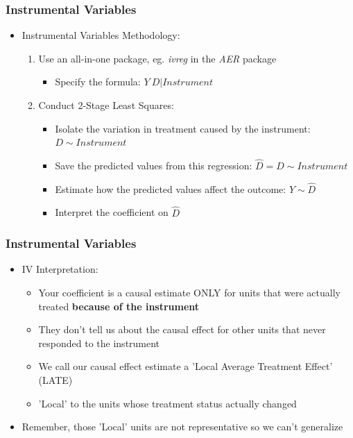 \documentclass[xcolor=x11names,compress]{beamer}\usepackage[]{graphicx}\usepackage[]{color}
\renewcommand{\(}{\begin{columns}}
\renewcommand{\)}{\end{columns}}
\newcommand{\<}[1]{\begin{column}{#1}}
\renewcommand{\>}{\end{column}}
\begin{document}
\begin{frame}
\frametitle{Instrumental Variables}
\begin{itemize}
\item Instrumental Variables Methodology:
\pause
\begin{enumerate}
\item Use an all-in-one package, eg. \textit{ivreg} in the \textit{AER} package
\begin{itemize}
\item Specify the formula: $Y ~ D | Instrument$
\pause
\end{itemize}
\item Conduct 2-Stage Least Squares: 
\pause
\begin{itemize}
\item Isolate the variation in treatment caused by the instrument: $D \sim Instrument$
\pause
\item Save the predicted values from this regression: $\hat{D} = D \sim Instrument$
\pause
\item Estimate how the predicted values affect the outcome: $Y \sim \hat{D}$
\pause
\item Interpret the coefficient on $\hat{D}$
\end{itemize}
\end{enumerate}
\end{itemize}
\end{frame}

\begin{frame}
\frametitle{Instrumental Variables}
\begin{itemize}
\item IV Interpretation:
\pause
\begin{itemize}
\item Your coefficient is a causal estimate ONLY for units that were actually treated \textbf{because of the instrument}
\pause
\item They don't tell us about the causal effect for other units that never responded to the instrument
\pause
\item We call our causal effect estimate a 'Local Average Treatment Effect' (LATE)
\item 'Local' to the units whose treatment status actually changed
\pause
\end{itemize}
\item Remember, those 'Local' units are not representative so we can't generalize
\end{itemize}
\end{frame}
\end{document}
